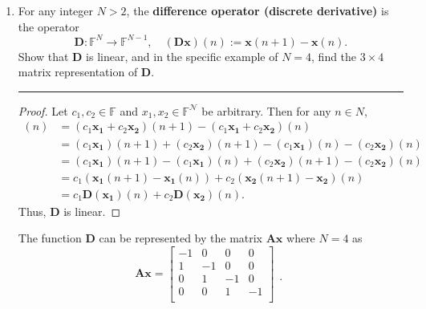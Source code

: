 \documentclass[12pt]{amsart}
\newcommand{\1}{\mathbbm{1}}
\numberwithin{equation}{section}
\numberwithin{Theorem}{section}
\theoremstyle{plain} %
\theoremstyle{definition}
\theoremstyle{remark}
\begin{document}
\thispagestyle{empty}

\bigskip


\begin{enumerate}[1.]



\item
For any integer $N>2$, the \textbf{difference operator (discrete derivative)} is the operator
\begin{equation*}
\mathbf{D}:\mathbb{F}^{N}\rightarrow\mathbb{F}^{N-1},\quad(\mathbf{D}\mathbf{x})(n):=\mathbf{x}(n+1)-\mathbf{x}(n).
\end{equation*}
Show that $\mathbf{D}$ is linear, and in the specific example of $N=4$, find the $3\times 4$ matrix representation of $\mathbf{D}$.

\bigskip
\hrule
\bigskip

\begin{proof}
	Let \(c_1,c_2 \in \mathbb{F}\) and \( x_1, x_2 \in \mathbb{F}^\mathcal{N} \) be arbitrary.
	Then for any \(n\in N\),
	\begin{align*}
		[\mathbf{D}(c_1\mathbf{x_1} + c_2\mathbf{x_2})](n)
		&= (c_1\mathbf{x_1} + c_2\mathbf{x_2})(n+1) - (c_1\mathbf{x_1} + c_2\mathbf{x_2})(n) \\
		&= (c_1\mathbf{x_1})(n+1) + (c_2\mathbf{x_2})(n+1) - (c_1\mathbf{x_1})(n) - (c_2\mathbf{x_2})(n) \\
		&= (c_1\mathbf{x_1})(n+1) - (c_1\mathbf{x_1})(n) + (c_2\mathbf{x_2})(n+1) - (c_2\mathbf{x_2})(n) \\
		&= c_1(\mathbf{x_1}(n+1) - \mathbf{x_1}(n)) + c_2(\mathbf{x_2}(n+1) - \mathbf{x_2})(n) \\
		&= c_1\mathbf{D}(\mathbf{x_1})(n) + c_2\mathbf{D}(\mathbf{x_2})(n).
	\end{align*}
	Thus, $\mathbf{D}$ is linear.
\end{proof}
The function \(\mathbf{D}\) can be represented by the matrix \(\mathbf{Ax}\) where \(N=4\) as
\[
\mathbf{Ax} = \begin{bmatrix}
	-1 & 0 & 0 & 0 \\
	1 & -1 & 0 & 0 \\
	0 & 1 & -1 & 0 \\
	0 & 0 & 1 & -1 \\
\end{bmatrix}
\begin{matrix}
	\\ \\ \\ .\\
\end{matrix}
\]


\end{enumerate}
\end{document}
